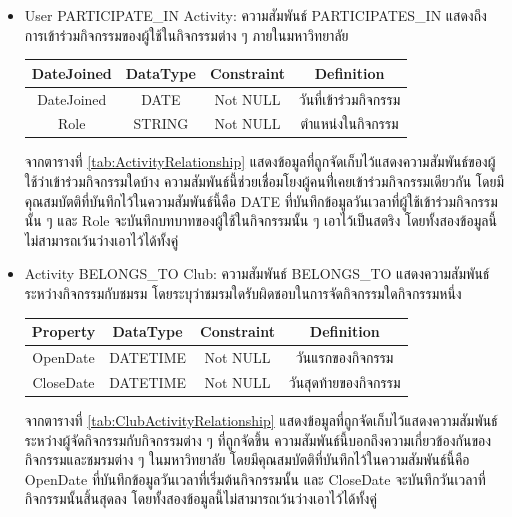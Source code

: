 \documentclass[14pt,oneside,openright,a4paper]{cpe-thai-project}
\begin{document}
\begin{itemize}
      \newpage
        \item User PARTICIPATE\_IN Activity: ความสัมพันธ์ PARTICIPATES\_IN แสดงถึงการเข้าร่วมกิจกรรมของผู้ใช้ในกิจกรรมต่าง ๆ ภายในมหาวิทยาลัย
        \begin{center}
          \begin{tabular}{|c|c|c|c|}
          \hline
          \rowcolor[HTML]{9FC5E8} 
          DateJoined & DataType & Constraint & Definition \\ \hline
          DateJoined & DATE     & Not NULL    & วันที่เข้าร่วมกิจกรรม \\ \hline
          Role       & STRING   & Not NULL    & ตำแหน่งในกิจกรรม \\ \hline
          \end{tabular}
          \label{tab:ActivityRelationship}
        \end{center}
        จากตารางที่ \ref{tab:ActivityRelationship} แสดงข้อมูลที่ถูกจัดเก็บไว้แสดงความสัมพันธ์ของผู้ใช้ว่าเข้าร่วมกิจกรรมใดบ้าง ความสัมพันธ์นี้ช่วยเชื่อมโยงผู้คนที่่เคยเข้าร่วมกิจกรรมเดียวกัน โดยมีคุณสมบัตติที่บันทึกไว้ในความสัมพันธ์นี้คือ DATE ที่บันทึกข้อมูลวันเวลาที่ผู้ใช้เข้าร่วมกิจกรรมนั้น ๆ และ Role จะบันทึกบทบาทของผู้ใช้ในกิจกรรมนั้น ๆ เอาไว้เป็นสตริง โดยทั้งสองข้อมูลนี้ไม่สามารถเว้นว่างเอาไว้ได้ทั้งคู่
        \item Activity BELONGS\_TO Club: ความสัมพันธ์ BELONGS\_TO แสดงความสัมพันธ์ระหว่างกิจกรรมกับชมรม โดยระบุว่าชมรมใดรับผิดชอบในการจัดกิจกรรมใดกิจกรรมหนึ่ง
        \begin{center}
          \begin{tabular}{|c|c|c|c|}
          \hline
          \rowcolor[HTML]{9FC5E8} 
          Property   & DataType & Constraint & Definition \\ \hline
          OpenDate   & DATETIME & Not NULL    & วันแรกของกิจกรรม \\ \hline
          CloseDate  & DATETIME & Not NULL    & วันสุดท้ายของกิจกรรม \\ \hline
          \end{tabular}
          \label{tab:ClubActivityRelationship}
        \end{center}
        จากตารางที่ \ref{tab:ClubActivityRelationship} แสดงข้อมูลที่ถูกจัดเก็บไว้แสดงความสัมพันธ์ระหว่างผู้จัดกิจกรรมกับกิจกรรมต่าง ๆ ที่ถูกจัดขึ้น ความสัมพันธ์นี้บอกถึงความเกี่ยวข้องกันของกิจกรรมและชมรมต่าง ๆ ในมหาวิทยาลัย โดยมีคุณสมบัตติที่บันทึกไว้ในความสัมพันธ์นี้คือ OpenDate ที่บันทึกข้อมูลวันเวลาที่เริ่มต้นกิจกรรมนั้น และ CloseDate จะบันทึกวันเวลาที่กิจกรรมนั้นสิ้นสุดลง โดยทั้งสองข้อมูลนี้ไม่สามารถเว้นว่างเอาไว้ได้ทั้งคู่
    \end{itemize}    
\end{document}
